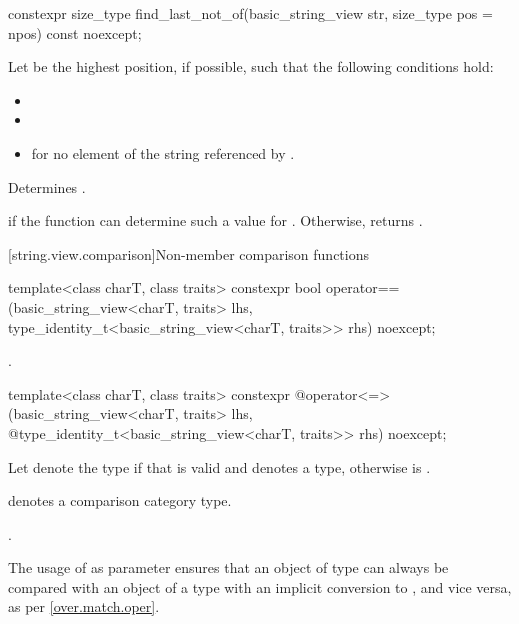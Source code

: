 %
\begin{itemdecl}
constexpr size_type find_last_not_of(basic_string_view str, size_type pos = npos) const noexcept;
\end{itemdecl}

\begin{itemdescr}
\pnum
Let  be the highest position, if possible, such that the following conditions hold:
\begin{itemize}
\item
{}
\item
{}
\item
{} for no element  of the string referenced by .
\end{itemize}

\pnum
\effects
Determines .

\pnum
\returns
{} if the function can determine such a value for .
Otherwise, returns .
\end{itemdescr}

[string.view.comparison]{Non-member comparison functions}

%
\begin{itemdecl}
template<class charT, class traits>
  constexpr bool operator==(basic_string_view<charT, traits> lhs,
                            type_identity_t<basic_string_view<charT, traits>> rhs) noexcept;
\end{itemdecl}

\begin{itemdescr}
\pnum
\returns
{}.
\end{itemdescr}

%
\begin{itemdecl}
template<class charT, class traits>
  constexpr @\seebelow@ operator<=>(basic_string_view<charT, traits> lhs,
            @\itcorr@                      type_identity_t<basic_string_view<charT, traits>> rhs) noexcept;
\end{itemdecl}

\begin{itemdescr}
\pnum
Let  denote the type  if
that  is valid and denotes a type,
otherwise  is .

\pnum
\mandates
{} denotes a comparison category type.

\pnum
\returns
{}.

\pnum
\begin{note}
The usage of  as parameter
ensures that an object of type 
can always be compared with an object of a type  with
an implicit conversion to , and
vice versa, as per \ref{over.match.oper}.
\end{note}
\end{itemdescr}

